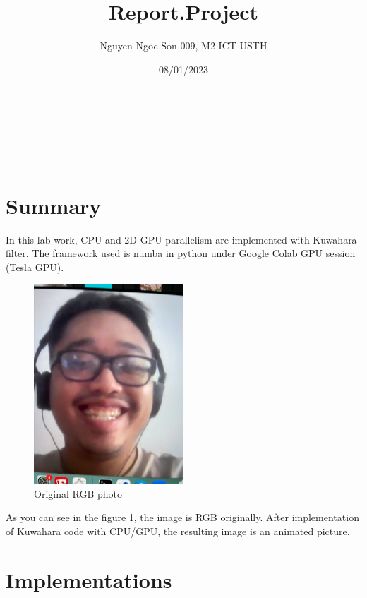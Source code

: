\documentclass[a4paper,11pt]{article}
\makeatletter
\newcommand{\linia}{\rule{\linewidth}{0.5pt}}
\theoremstyle{mytheor}
\renewcommand{\maketitle}{
\begin{center}
\vspace{2ex}
{\huge \textsc{\@title}}
\vspace{1ex}
\\
\linia\\
\@author \hfill \@date
\vspace{4ex}
\end{center}
}
\makeatother
\begin{document}
\title{Report.Project }

\author{Nguyen Ngoc Son 009, M2-ICT USTH}

\date{08/01/2023}

\maketitle

\section*{Summary}


In this lab work, CPU and 2D GPU parallelism are implemented with Kuwahara filter. The framework used is numba in python under Google Colab GPU session (Tesla GPU).

\begin{figure}[h]
    \centering
    \includegraphics[width=0.5\textwidth]{images/test.jpg}
    \caption{Original RGB photo}
    \label{fig:test}
\end{figure}

As you can see in the figure \ref{fig:test}, the image is RGB originally. After implementation of Kuwahara code with CPU/GPU, the resulting image is an animated picture.

\section*{Implementations}
\end{document}
